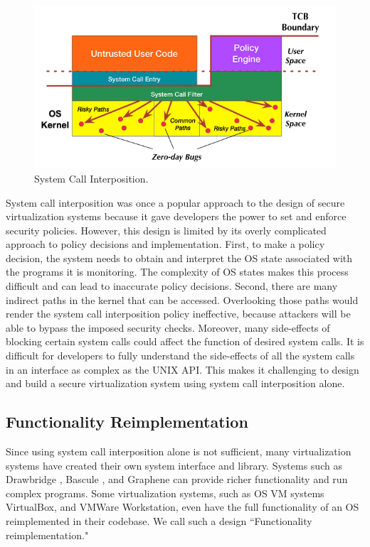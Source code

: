 \begin{figure}%
\centering
\includegraphics[width=1.0\columnwidth]{diagram/Virtualization_Design_Model_03.png}
\caption{\small System Call Interposition.}
\label{fig:design_system_call_interposition}
\end{figure}

System call interposition was once a popular approach to the design of secure
virtualization systems because it gave developers the power to set and enforce
security policies.
  However, this design
is limited by its overly complicated approach to policy decisions and implementation.
First, to make a policy decision, the system needs to
obtain and interpret the OS state associated with the programs it is monitoring.
The complexity of OS states makes this process difficult and can lead to
inaccurate policy decisions.
Second, there are many indirect paths in the kernel that can be accessed.
Overlooking those paths would render the
system call interposition policy ineffective, because attackers will be able to
bypass the imposed security checks. Moreover, many side-effects of blocking
certain system calls could affect the function of desired system calls.
It is difficult for developers to fully understand the side-effects of all the
system calls in an interface as complex as the UNIX API. This makes
it challenging to design and build a secure virtualization system using
system call interposition alone.

\subsection{Functionality Reimplementation}
Since using system call interposition alone is not sufficient,
many virtualization systems have created their own system
interface and library. Systems such as  Drawbridge \cite{Drawbridge-11},
 Bascule \cite{Bascule}, and Graphene \cite{Graphene-14} can
provide richer functionality and run complex programs. Some virtualization
systems, such as OS VM systems VirtualBox, and VMWare Workstation, even have the
full functionality of an OS reimplemented in their codebase. We call such a design
``Functionality reimplementation."


